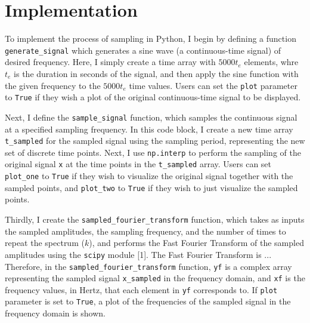 \documentclass{article}
\begin{document}
\section{Implementation}
To implement the process of sampling in Python, I begin by defining a function \verb|generate_signal| which generates a sine wave (a continuous-time signal) of desired frequency.
Here, I simply create a time array with $5000t_e$ elements, whre $t_e$ is the duration in seconds of the signal, 
and then apply the sine function with the given frequency to the $5000 t_e$ time values. 
Users can set the \verb|plot| parameter to \verb|True| if they wish a plot of the original continuous-time signal to be displayed.

Next, I define the \verb|sample_signal| function, which samples the continuous signal at a specified sampling frequency.
In this code block, I create a new time array \verb|t_sampled| for the sampled signal using the sampling period, representing the new set of discrete time points. 
Next, I use \verb|np.interp| to perform the sampling of the original signal \verb|x| at the time points in the \verb|t_sampled| array.
Users can set \verb|plot_one| to \verb|True| if they wish to visualize the original signal together with the sampled points, 
and \verb|plot_two| to \verb|True| if they wish to just visualize the sampled points.

Thirdly, I create the \verb|sampled_fourier_transform| function, which takes as inputs the sampled amplitudes, the sampling frequency, and the number of times to repeat the spectrum ($k$), 
and performs the Fast Fourier Transform of the sampled amplitudes using the \verb|scipy| module [1].
The Fast Fourier Transform is ... %
Therefore, in the \verb|sampled_fourier_transform| function, \verb|yf| is a complex array representing the sampled signal \verb|x_sampled| in the frequency domain, 
and \verb|xf| is the frequency values, in Hertz, that each element in \verb|yf| corresponds to.
If \verb|plot| parameter is set to \verb|True|, a plot of the frequencies of the sampled signal in the frequency domain is shown.
\end{document}
